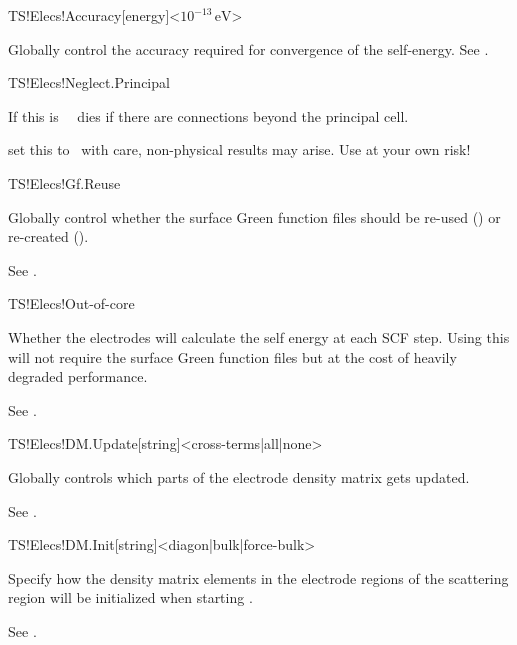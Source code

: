 \begin{fdfentry}{TS!Elecs!Accuracy}[energy]<$10^{-13}\,\mathrm{eV}$>
  
  Globally control the accuracy required for convergence of the self-energy.
  See .
  
\end{fdfentry}

\begin{fdflogicalF}{TS!Elecs!Neglect.Principal}
  
  If this is \fdffalse\ \tsiesta\ dies if there are connections beyond
  the principal cell.

  \note set this to \fdftrue\ with care, non-physical results may
  arise. Use at your own risk!

\end{fdflogicalF}  

\begin{fdflogicalT}{TS!Elecs!Gf.Reuse}
  
  Globally control whether the surface Green function files should
  be re-used (\fdftrue) or re-created (\fdffalse).

  See .
  
\end{fdflogicalT}

\begin{fdflogicalT}{TS!Elecs!Out-of-core}

  Whether the electrodes will calculate the self energy at each SCF
  step. Using this will not require the surface Green function files
  but at the cost of heavily degraded performance.

  See .
  
\end{fdflogicalT}

\begin{fdfentry}{TS!Elecs!DM.Update}[string]<cross-terms|all|none>

  Globally controls which parts of the electrode density matrix
  gets updated. 

  See .
  
\end{fdfentry}

\begin{fdfentry}{TS!Elecs!DM.Init}[string]<diagon|bulk|force-bulk>

  Specify how the density matrix elements in the electrode regions of
  the scattering region will be initialized when starting \tsiesta.

  See .

\end{fdfentry}

